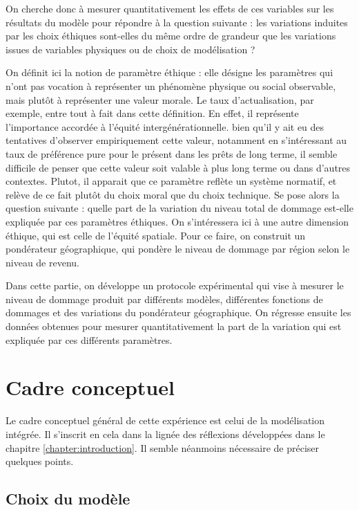 On cherche donc à mesurer quantitativement les effets de ces variables sur les résultats du modèle pour répondre à la question suivante : les variations induites par les choix éthiques sont-elles du même ordre de grandeur que les variations issues de variables physiques ou de choix de modélisation ? 



On définit ici la notion de paramètre éthique : elle désigne les paramètres qui n'ont pas vocation à représenter un phénomène physique ou social observable, mais plutôt à représenter une valeur morale. Le taux d'actualisation, par exemple, entre tout à fait dans cette définition. En effet, il représente l'importance accordée à l'équité intergénérationnelle. bien qu'il y ait eu des tentatives d'observer empiriquement cette valeur, notamment en s'intéressant au taux de préférence pure pour le présent dans les prêts de long terme, il semble difficile de penser que cette valeur soit valable à plus long terme ou dans d'autres contextes. Plutot, il apparait que ce paramètre reflète un système normatif, et relève de ce fait plutôt du choix moral que du choix technique. Se pose alors la question suivante : quelle part de la variation du niveau total de dommage est-elle expliquée par ces paramètres éthiques.  On s'intéressera ici à une autre dimension éthique, qui est celle de l'équité spatiale. Pour ce faire, on construit un pondérateur géographique, qui pondère le niveau de dommage par région selon le niveau de revenu.

Dans cette partie, on développe un protocole expérimental qui vise à mesurer le niveau de dommage produit par différents modèles, différentes fonctions de dommages et des variations du pondérateur géographique. On régresse ensuite les données obtenues pour mesurer quantitativement la part de la variation qui est expliquée par ces différents paramètres. 

\section{Cadre conceptuel}

Le cadre conceptuel général de cette expérience est celui de la modélisation intégrée. Il s'inscrit en cela dans la lignée des réflexions développées dans le chapitre \ref{chapter:introduction}. Il semble néanmoins nécessaire de préciser quelques points. \\

\subsection{Choix du modèle}

